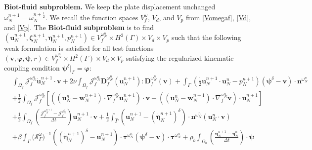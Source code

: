 \documentclass[11pt]{article}
\newcommand{\bd}{\boldsymbol}
\theoremstyle{definition}
\begin{document}
\noindent \textbf{Biot-fluid subproblem.} We keep the plate displacement unchanged $\omega^{n + 1}_{N} = \omega^{n + \frac{1}{2}}_{N}$. We recall the function spaces $V^{\omega}_{f}$, $V_{d}$, and $V_{p}$ from \eqref{Vomegaf}, \eqref{Vd}, and \eqref{Vp}. The \textbf{Biot-fluid subproblem} is to find $(\bd{u}^{n + 1}_{N}, \bd{\zeta}^{n + 1}_{N}, \bd{\eta}^{n + 1}_{N}, p^{n + 1}_{N}) \in V^{\omega^{n}_{N}}_{f} \times H^{2}(\Gamma) \times V_{d} \times V_{p}$ such that the following weak formulation is satisfied for all test functions $(\bd{v}, \bd{\varphi}, \bd{\psi}, r) \in V^{\omega^{n}_{N}}_{f} \times H^{2}(\Gamma) \times V_{d} \times V_{p}$ satisfying the regularized kinematic coupling condition $\bd{\psi}^{\delta}|_{\Gamma} = \bd{\varphi}$:
\begin{equation}\label{weakBiot1}
\begin{aligned}
&\int_{\Omega_{f}} \mathcal{J}^{\omega^{n}_{N}}_{f} \dot{\bd{u}}^{n + 1}_{N} \cdot \boldsymbol{v} 
+ 2\nu \int_{\Omega_{f}} \mathcal{J}^{\omega^{n}_{N}}_{f} \bd{D}^{\omega^{n}_{N}}_{f}(\boldsymbol{u}^{n + 1}_{N}) : \bd{D}^{\omega^{n}_{N}}_{f}(\boldsymbol{v}) + \int_{\Gamma} \left(\frac{1}{2}\boldsymbol{u}^{n + 1}_{N} \cdot \boldsymbol{u}^{n}_{N} - p^{n + 1}_{N}\right)(\boldsymbol{\psi}^{\delta} - \boldsymbol{v})\cdot \boldsymbol{n}^{\omega^{n}_{N}} 
\\
&+ \frac{1}{2} \int_{\Omega_{f}} \mathcal{J}^{\omega^{n}_{N}}_{f} \left[\left(\left(\boldsymbol{u}^{n}_{N} - \bd{w}^{n + 1}_{N}\right) \cdot \nabla^{\omega^{n}_{N}}_{f} \boldsymbol{u}^{n + 1}_{N}\right) \cdot \boldsymbol{v} - \left(\left(\boldsymbol{u}^{n}_{N} - \bd{w}^{n + 1}_{N}\right) \cdot \nabla^{\omega^{n}_{N}}_{f} \boldsymbol{v}\right) \cdot \boldsymbol{u}^{n + 1}_{N}\right] 
\\
&+ \frac{1}{2} \int_{\Omega_{f}} \left(\frac{\mathcal{J}^{\omega^{n + 1}_{N}}_{f} - \mathcal{J}^{\omega^{n}_{N}}_{f}}{\Delta t}\right) \bd{u}^{n + 1}_{N} \cdot \boldsymbol{v} + \frac{1}{2} \int_{\hat{\Gamma}} \left(\boldsymbol{u}^{n + 1}_{N} - \left(\dot{\bd{\eta}}^{n + 1}_{N}\right)^{\delta}\right) \cdot \boldsymbol{n}^{\omega^{n}_{N}} (\boldsymbol{u}^{n}_{N} \cdot \boldsymbol{v}) 
\\
&+ \beta \int_{\Gamma} \Big(\mathcal{S}^{\omega}_{\Gamma}\Big)^{-1} \left(\left(\boldsymbol{\dot{\eta}}^{n + 1}_{N}\right)^{\delta} - \boldsymbol{u}^{n + 1}_{N}\right) \cdot \boldsymbol{\tau}^{\omega^{n}_{N}} (\boldsymbol{\psi}^{\delta} - \boldsymbol{v}) \cdot \boldsymbol{\tau}^{\omega^{n}_{N}} + \rho_{b} \int_{\Omega_{b}} \left(\frac{\boldsymbol{\dot{\eta}}^{n + 1}_{N} - \boldsymbol{\dot{\eta}}^{n}_{N}}{\Delta t}\right) \cdot \boldsymbol{\psi} 

\end{aligned}
\end{equation}
\end{document}
